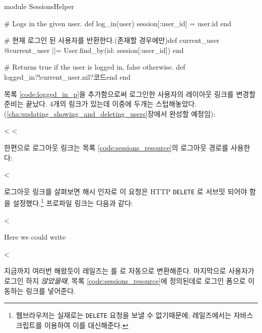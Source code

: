 \begin{codelisting} \label{code:logged_in_p}  

\begin{code} module SessionsHelper 

# Logs in the given user. def log_in(user) session[:user_id] = user.id end 

# 현재 로그인 된 사용자를 반환한다.(존재할 경우에만)def current_user @current_user ||= User.find_by(id: session[:user_id]) end 

# Returns true if the user is logged in, false otherwise. def logged_in?!current_user.nil?코드end end \end{code} \end{codelisting} 

목록 \ref{code:logged_in_p}을 추가함으로써 로그인한 사용자의 레이아웃 링크를 변경할 준비는 끝났다. 4개의 링크가 있는데 이중에 두개는 스텁해놓았다. (\ref{cha:updating_showing_and_deleting_users}장에서 완성할 예정임): 

\begin{code} < < \end{code} 

\noindent 한편으로 로그아웃 링크는 목록 \ref{code:sessions_resource}의 로그아웃 경로를 사용한다: 

\begin{code} < \end{code} 

\noindent 로그아웃 링크를 살펴보면 해시 인자로 이 요청은 HTTP \texttt{DELETE} 로 서브밋 되어야 함을 설정했다.\footnote{웹브라우저는 실재로는 \texttt{DELETE} 요청을 보낼 수 없기때문에; 레일즈에서는 자바스크립트를 이용하여 이를 대신해준다.} 프로파일 링크는 다음과 같다: 

\begin{code} < \end{code} 

\noindent Here we could write 

\begin{code} < \end{code} 

\noindent 지금까지 여러번 해왔듯이 레일즈는 를 로 자동으로 변환해준다. 마지막으로 사용자가 로그인 하지 \emph{않았을때}, 목록 \ref{code:sessions_resource}에 정의된데로 로그인 폼으로 이동하는 링크를 넣어준다. 

